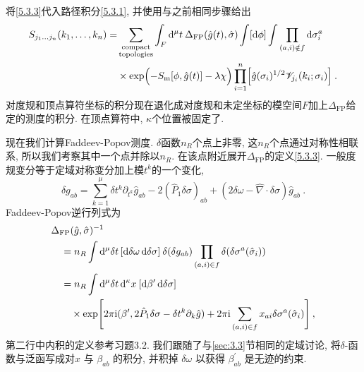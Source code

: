 将\eqref{5.3.3}代入路径积分\eqref{5.3.1}, 并使用与之前相同步骤给出
	\begin{align}
		S_{j_{1} \ldots j_{n}}(k_{1}, \ldots, k_{n})=& \sum_{\substack{\text{compact}\\ \text{topologies}} } \int_{F} \mathrm{d}^{\mu} t \: 
		\Delta_{\mathrm{FP}}(\hat{g}(t), \hat{\sigma}) \int[\mathrm{d} \phi] \int \prod_{(a, i) \notin f} \mathrm{d} \sigma_{i}^{a}  \nonumber \\	
		&\times \exp \Bigl(-S_{\mathrm{m}}[\phi, \hat{g}(t)]-\lambda \chi\Bigr)
		 \prod_{i=1}^{n}\Bigl[\hat{g}(\sigma_{i})^{1 / 2} \mathscr{V}_{j_{i}}(k_{i} ; \sigma_{i})\Bigr] \:. \label{5.3.4}
	\end{align}
对度规和顶点算符坐标的积分现在退化成对度规和未定坐标的模空间$F$加上$\Delta_{\mathrm{FP}} $给定的测度的积分. 在顶点算符中, $\kappa$个位置被固定了.

现在我们计算Faddeev-Popov测度. $\delta$函数$n_{R}$个点上非零, 这$n_{R}$个点通过对称性相联系, 所以我们考察其中一个点并除以$n_{R}$. 
在该点附近展开$\Delta_{\mathrm{FP}}$的定义\eqref{5.3.3}. 一般度规变分等于定域对称变分加上模$t^{k}$的一个变化,
\begin{equation}
	\delta g_{a b}=\sum_{k=1}^{\mu} \delta t^{k} \partial_{t^{k}} \hat{g}_{a b}-2(\hat{P}_{1} \delta \sigma)_{a b}+(2 \delta \omega-\hat{\nabla} \cdot \delta \sigma) \hat{g}_{a b} \:. \label{5.3.5}
\end{equation}
Faddeev-Popov逆行列式为
	\begin{align}
		&\Delta_{\mathrm{FP}}(\hat{g}, \hat{\sigma})^{-1} \nonumber \\
		&\quad =n_{R} \int \mathrm{d}^{\mu} \delta t\,[\mathrm{d} \delta \omega\, \mathrm{d} \delta \sigma]\: \delta(\delta g_{a b}) 
		\prod_{(a, i) \in f} \delta(\delta \sigma^{a}(\hat{\sigma}_{i})) \nonumber \\
		&\quad =n_{R}  \int \mathrm{d}^{\mu} \delta t\, \mathrm{d}^{\kappa} x \: [\mathrm{d} \beta^{\prime} \,\mathrm{d} \delta \sigma] \nonumber  \\
		&\qquad \times \exp \Biggl[2 \pi \mathrm{i} (\beta^{\prime}, 2 \hat{P}_{1} \delta \sigma-\delta t^{k} \partial_{k} \hat{g})
		+2 \pi \mathrm{i} \sum_{(a, i) \in f} x_{a i} \delta \sigma^{a}(\hat{\sigma}_{i})\Biggr] \:, \label{5.3.6}
	\end{align}
第二行中内积的定义参考习题3.2. 我们跟随了与\ref{sec:3.3}节相同的定域讨论, 将$\delta$-函数与泛函写成对$x$ 与 $\beta_{a b}$ 的积分, 并积掉 $\delta \omega$ 以获得 $\beta_{a b}^{\prime}$ 是无迹的约束.

